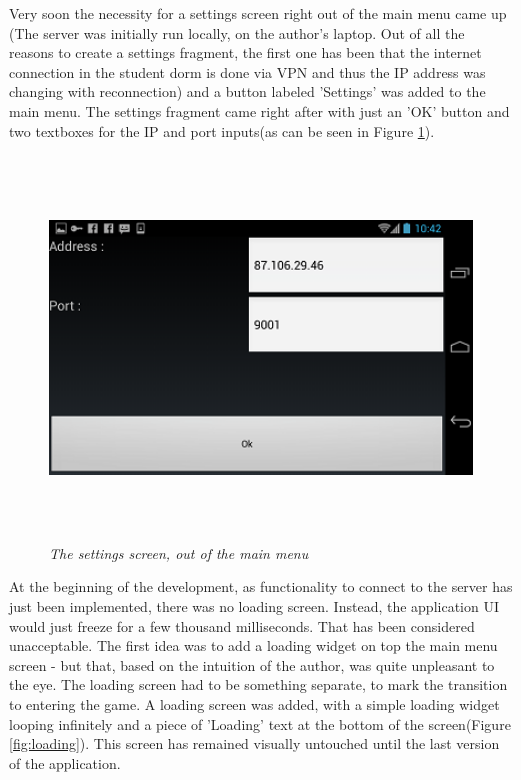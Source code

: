 \documentclass{article}
\begin{document}
Very soon the necessity for a settings screen right out of the main menu came up
(The server was initially run locally, on the author's laptop. Out of all the
reasons to create a settings fragment, the first one has been that the internet
connection in the student dorm is done via VPN and thus the IP address was
changing with reconnection) and a button labeled 'Settings' was added to the
main menu. The settings fragment came right after with just an 'OK' button and
two textboxes for the IP and port inputs(as can be seen in Figure
\ref{fig:main_menu_settings}).\newline

\begin{figure}
\includegraphics[height=4in,width=7.12in]{./images/android_screenshots/tutorial_main_settings.png}  
\caption{\small \sl The settings screen, out of the main
menu\label{fig:main_menu_settings}}
\end{figure}

At the beginning of the development, as functionality to connect to the server
has just been implemented, there was no loading screen. Instead, the application
UI would just freeze for a few thousand milliseconds. That has been considered
unacceptable. The first idea was to add a loading widget on top the main menu
screen - but that, based on the intuition of the author, was quite unpleasant to
the eye. The loading screen had to be something separate, to mark the transition
to entering the game. A loading screen was added, with a simple loading widget
looping infinitely and a piece of 'Loading' text at the bottom of the
screen(Figure \ref{fig:loading}). This screen has remained visually untouched
until the last version of the application.\newline
\end{document}
